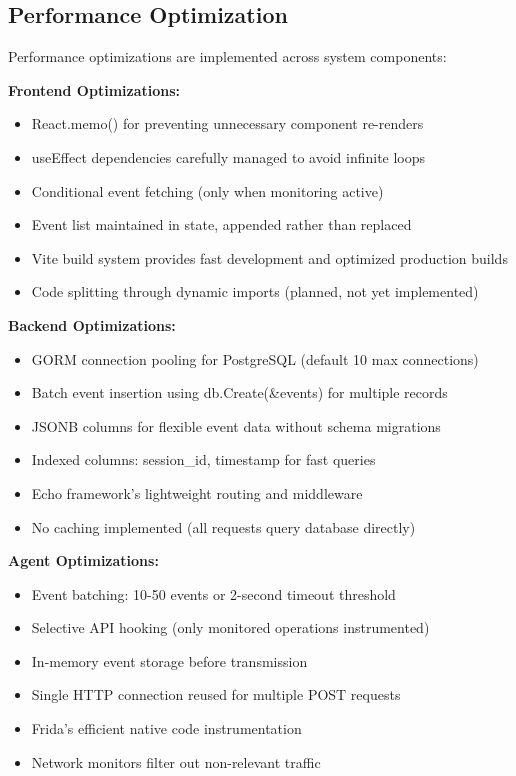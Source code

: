 \subsection{Performance Optimization}

Performance optimizations are implemented across system components:

\textbf{Frontend Optimizations:}
\begin{itemize}
    \item React.memo() for preventing unnecessary component re-renders
    \item useEffect dependencies carefully managed to avoid infinite loops
    \item Conditional event fetching (only when monitoring active)
    \item Event list maintained in state, appended rather than replaced
    \item Vite build system provides fast development and optimized production builds
    \item Code splitting through dynamic imports (planned, not yet implemented)
\end{itemize}

\textbf{Backend Optimizations:}
\begin{itemize}
    \item GORM connection pooling for PostgreSQL (default 10 max connections)
    \item Batch event insertion using db.Create(\&events) for multiple records
    \item JSONB columns for flexible event data without schema migrations
    \item Indexed columns: session\_id, timestamp for fast queries
    \item Echo framework's lightweight routing and middleware
    \item No caching implemented (all requests query database directly)
\end{itemize}

\textbf{Agent Optimizations:}
\begin{itemize}
    \item Event batching: 10-50 events or 2-second timeout threshold
    \item Selective API hooking (only monitored operations instrumented)
    \item In-memory event storage before transmission
    \item Single HTTP connection reused for multiple POST requests
    \item Frida's efficient native code instrumentation
    \item Network monitors filter out non-relevant traffic
\end{itemize}

